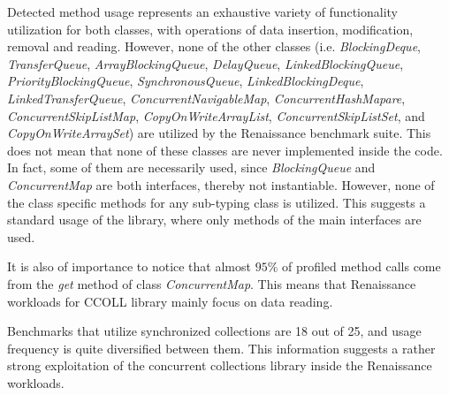 \documentclass[]{usiinfthesis}
\begin{document}
 Detected method usage represents an exhaustive variety of functionality utilization for both classes, with operations of data insertion, modification, removal and reading. However, none of the other classes (i.e. \textit{BlockingDeque}, \textit{TransferQueue}, \textit{ArrayBlockingQueue}, \textit{DelayQueue}, \textit{LinkedBlockingQueue}, \textit{PriorityBlockingQueue}, \textit{SynchronousQueue}, \textit{LinkedBlockingDeque}, \textit{LinkedTransferQueue}, \textit{ConcurrentNavigableMap}, \textit{ConcurrentHashMapare}, \textit{ConcurrentSkipListMap}, \textit{CopyOnWriteArrayList}, \textit{ConcurrentSkipListSet}, and \textit{CopyOnWriteArraySet}) are utilized by the Renaissance benchmark suite. This does not mean that none of these classes are never implemented inside the code. In fact, some of them are necessarily used, since \textit{BlockingQueue} and \textit{ConcurrentMap} are both interfaces, thereby not instantiable. However, none of the class specific methods for any sub-typing class is utilized. This suggests a standard usage of the library, where only methods of the main interfaces are used. 
 
 It is also of importance to notice that almost \(95\%\) of profiled method calls come from the \textit{get} method of class \textit{ConcurrentMap}. This means that Renaissance workloads for CCOLL library mainly focus on data reading.
 
 Benchmarks that utilize synchronized collections are 18 out of 25, and usage frequency is quite diversified between them. This information suggests a rather strong exploitation of the concurrent collections library inside the Renaissance workloads.
\end{document}
